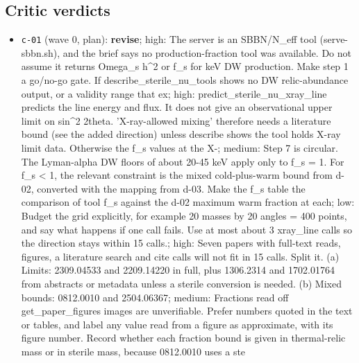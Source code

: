 \documentclass[11pt,a4paper]{article}
\begin{document}
\subsection{Critic verdicts}
\begin{itemize}
  \item \texttt{c-01} (wave 0, plan): \textbf{revise}; high: The server is an SBBN/N\_eff tool (serve-sbbn.sh), and the brief says no production-fraction tool was available. Do not assume it returns Omega\_s h\textasciicircum{}2 or f\_s for keV DW production. Make step 1 a go/no-go gate. If describe\_sterile\_nu\_tools shows no DW relic-abundance output, or a validity range that ex; high: predict\_sterile\_nu\_xray\_line predicts the line energy and flux. It does not give an observational upper limit on sin\textasciicircum{}2 2theta. 'X-ray-allowed mixing' therefore needs a literature bound (see the added direction) unless describe shows the tool holds X-ray limit data. Otherwise the f\_s values at the X-; medium: Step 7 is circular. The Lyman-alpha DW floors of about 20-45 keV apply only to f\_s = 1. For f\_s \textless{} 1, the relevant constraint is the mixed cold-plus-warm bound from d-02, converted with the mapping from d-03. Make the f\_s table the comparison of tool f\_s against the d-02 maximum warm fraction at each; low: Budget the grid explicitly, for example 20 masses by 20 angles = 400 points, and say what happens if one call fails. Use at most about 3 xray\_line calls so the direction stays within 15 calls.; high: Seven papers with full-text reads, figures, a literature search and cite calls will not fit in 15 calls. Split it. (a) Limits: 2309.04533 and 2209.14220 in full, plus 1306.2314 and 1702.01764 from abstracts or metadata unless a sterile conversion is needed. (b) Mixed bounds: 0812.0010 and 2504.06367; medium: Fractions read off get\_paper\_figures images are unverifiable. Prefer numbers quoted in the text or tables, and label any value read from a figure as approximate, with its figure number. Record whether each fraction bound is given in thermal-relic mass or in sterile mass, because 0812.0010 uses a ste

\end{itemize}
\end{document}
